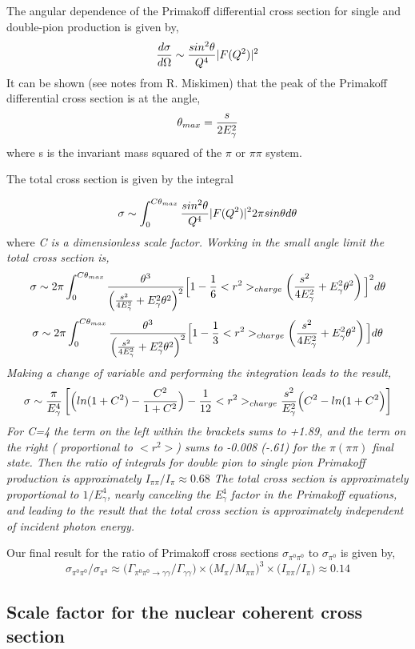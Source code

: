The angular dependence of the Primakoff differential cross section for single and double-pion production is given by,
$$ {d\sigma \over d \Omega} \sim {sin^2 \theta \over Q^4}|F(Q^2)|^2$$
It can be shown (see notes from R. Miskimen) that the peak of the Primakoff differential cross section is at the angle,
$$ \theta_{max}={s \over 2 E^2_\gamma}$$
where s is the invariant mass squared of the $\pi$ or $\pi \pi$ system.   

The total cross section is given by the integral

$$ \sigma \sim \int^{C\theta_{max}}_0 {sin^2 \theta \over Q^4}|F(Q^2)|^2 2 \pi sin \theta d\theta$$
where \it C \rm is a dimensionless scale factor. Working in the small angle limit the total cross section is,
$$\sigma \sim 2\pi \int^{C\theta_{max}}_0 
{\theta^3 \over \left( {s^2 \over 4E^2_\gamma}+ E^2_\gamma \theta^2  \right)^2} 
\Big[ 1-{1 \over 6}<r^2>_{charge}\left( {s^2 \over 4E^2_\gamma}+ E^2_\gamma \theta^2  \right)\Big]^2
d \theta$$
$$\sigma \sim 2\pi \int^{C\theta_{max}}_0 
{\theta^3 \over \left( {s^2 \over 4E^2_\gamma}+ E^2_\gamma \theta^2  \right)^2} 
\Big[ 1-{1 \over 3}<r^2>_{charge}\left( {s^2 \over 4E^2_\gamma}+ E^2_\gamma \theta^2  \right)\Big]
d \theta$$
Making a change of variable and performing the integration leads to the result, 
$$ \sigma \sim {\pi \over E^4_\gamma}
\left[ \Big( ln(1+C^2)-{C^2 \over 1+C^2}  \Big)
- {1 \over 12}<r^2>_{charge}{s^2 \over E^2_\gamma}
\Big(C^2-ln(1+C^2 \Big) \right]$$
For C=4 the term on the left within the brackets sums to +1.89, and the term on the right ( proportional to $<r^2>$) sums to -0.008 (-.61) for the $\pi (\pi \pi)$ final state.  Then the ratio of integrals for double pion to single pion Primakoff production is approximately $I_{\pi\pi} / I_{\pi} \approx 0.68$
The total cross section is approximately proportional to $1/E^4_\gamma$, nearly canceling the E$^4_\gamma$ factor in the Primakoff equations, and leading to the result that the total cross section is approximately independent of incident photon energy.   


Our final result for the ratio of Primakoff cross sections $\sigma_{\pi^0 \pi^0}$ to $ \sigma_{\pi^0}$ is given by, 
$$  \sigma_{\pi^0 \pi^0}   \Big/ \sigma_{ \pi^0}   
\approx 
\Big(\Gamma_{\pi^0 \pi^0 \rightarrow \gamma \gamma}
\Big/ \Gamma_{\gamma \gamma} \Big)
\times \Big( M_\pi \Big/ 
M_{\pi \pi}\Big)^3\times \Big( I_{\pi \pi} \Big/ I_\pi \Big)
\approx 0.14$$



 \subsection{Scale factor for the nuclear coherent cross section}

